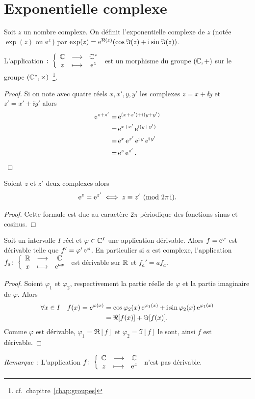 \section{Exponentielle complexe}
\label{sec:expcomplexe}
\begin{defdef}
  Soit \(z\) un nombre complexe. On définit l'exponentielle complexe de \(z\) (notée \(\exp(z)\) ou \(\operatorname{e}^z\)) par \(\exp(z)=\operatorname{e}^{\Re(z)}(\cos \Im(z) + \operatorname{i} \sin \Im(z))\).
\end{defdef}
\begin{prop}
  L'application \(\colon \left\{\begin{array}{ccc} \mathbb{C} & \longrightarrow &\mathbb{C}^*\\ z & \longmapsto & \operatorname{e}^z \end{array} \right.\) est un morphisme du groupe \((\mathbb{C},+)\) sur le groupe \((\mathbb{C}^*,\times)\)~\footnote{cf.\ chapitre~\ref{chap:groupes}}.
\end{prop}
\begin{proof}
  Si on note avec quatre réels \(x,x',y,y'\) les complexes \(z=x+\ii y\) et \(z'=x'+\ii y'\) alors
  \begin{align}
    \operatorname{e}^{z+z'} =& \operatorname{e}^{(x+x') + \operatorname{i}(y+y')}\\
    =&\operatorname{e}^{x+x'} \operatorname{e}^{\operatorname{i} (y+y')}\\
    =& \operatorname{e}^{x} \operatorname{e}^{x'} \operatorname{e}^{\operatorname{i} y} \operatorname{e}^{\operatorname{i} y'}\\
    =& \operatorname{e}^z \operatorname{e}^{z'}.
  \end{align}
\end{proof}
%
\begin{prop}
  Soient \(z\) et \(z'\) deux complexes alors
  \begin{equation}
    \operatorname{e}^z=\operatorname{e}^{z'} \iff z \equiv z' \pmod {2\pi \operatorname{i}}.
  \end{equation}
\end{prop}
\begin{proof}
   Cette formule est due au caractère \(2\pi\)-périodique des fonctions sinus et cosinus.
 \end{proof}
%
 \begin{prop}
   Soit un intervalle \(I\) réel et \(\varphi \in \mathbb{C}^{I}\) une application dérivable. Alors \(f=\operatorname{e}^\varphi\) est dérivable telle que \(f'=\varphi' \operatorname{e}^\varphi\). En particulier si \(a\) est complexe, l'application \(f_a\colon \left\{\begin{array}{ccc} \mathbb{R} & \longrightarrow &\mathbb{C}\\ x & \longmapsto & \operatorname{e}^{ax} \end{array} \right.\) est dérivable sur \(\mathbb{R}\) et \(f_a'=af_a\).
 \end{prop}
 \begin{proof}
   Soient \(\varphi_1\) et \(\varphi_2\), respectivement la partie réelle de \(\varphi\) et la partie imaginaire de \(\varphi\). Alors
   \begin{align}
     \forall x \in I \quad f(x)=e^{\varphi(x)}&=\cos \varphi_2(x) \operatorname{e}^{\varphi_1(x)}+ \operatorname{i} \sin \varphi_2(x)\operatorname{e}^{\varphi_1(x)} \\
     &= \Re[f(x)] + \Im[f(x)].
   \end{align}
  Comme \(\varphi\) est dérivable, \(\varphi_1=\Re[f]\) et \(\varphi_2=\Im[f]\) le sont, ainsi \(f\) est dérivable.
\end{proof}
\emph{Remarque}~: L'application \(f\colon \left\{\begin{array}{ccc} \mathbb{C} & \longrightarrow &\mathbb{C}\\ z & \longmapsto & \operatorname{e}^z \end{array} \right.\) n'est pas dérivable.

